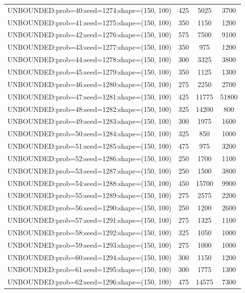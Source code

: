 \begin{longtable}{lccc}
UNBOUNDED:prob=40:seed=1274:shape=(150, 100)  &      425 &  5025 &   3700 \\
UNBOUNDED:prob=41:seed=1275:shape=(150, 100)  &      350 &  1150 &   1200 \\
UNBOUNDED:prob=42:seed=1276:shape=(150, 100)  &      575 &  7500 &   9100 \\
UNBOUNDED:prob=43:seed=1277:shape=(150, 100)  &      350 &   975 &   1200 \\
UNBOUNDED:prob=44:seed=1278:shape=(150, 100)  &      300 &  3325 &   3800 \\
UNBOUNDED:prob=45:seed=1279:shape=(150, 100)  &      350 &  1125 &   1300 \\
UNBOUNDED:prob=46:seed=1280:shape=(150, 100)  &      275 &  2250 &   2700 \\
UNBOUNDED:prob=47:seed=1281:shape=(150, 100)  &      425 & 11775 &  51800 \\
UNBOUNDED:prob=48:seed=1282:shape=(150, 100)  &      325 & 14200 &    800 \\
UNBOUNDED:prob=49:seed=1283:shape=(150, 100)  &      300 &  1975 &   1600 \\
UNBOUNDED:prob=50:seed=1284:shape=(150, 100)  &      325 &   850 &   1000 \\
UNBOUNDED:prob=51:seed=1285:shape=(150, 100)  &      475 &   975 &   3200 \\
UNBOUNDED:prob=52:seed=1286:shape=(150, 100)  &      250 &  1700 &   1100 \\
UNBOUNDED:prob=53:seed=1287:shape=(150, 100)  &      250 &  1500 &   3800 \\
UNBOUNDED:prob=54:seed=1288:shape=(150, 100)  &      450 & 15700 &   9900 \\
UNBOUNDED:prob=55:seed=1289:shape=(150, 100)  &      275 &  2575 &   2200 \\
UNBOUNDED:prob=56:seed=1290:shape=(150, 100)  &      250 &  1200 &   2600 \\
UNBOUNDED:prob=57:seed=1291:shape=(150, 100)  &      275 &  1325 &   1100 \\
UNBOUNDED:prob=58:seed=1292:shape=(150, 100)  &      325 &  1050 &   1000 \\
UNBOUNDED:prob=59:seed=1293:shape=(150, 100)  &      275 &  1000 &   1000 \\
UNBOUNDED:prob=60:seed=1294:shape=(150, 100)  &      300 &  1150 &   1200 \\
UNBOUNDED:prob=61:seed=1295:shape=(150, 100)  &      300 &  1775 &   1300 \\
UNBOUNDED:prob=62:seed=1296:shape=(150, 100)  &      475 & 14575 &   7300 \\

\end{longtable}
